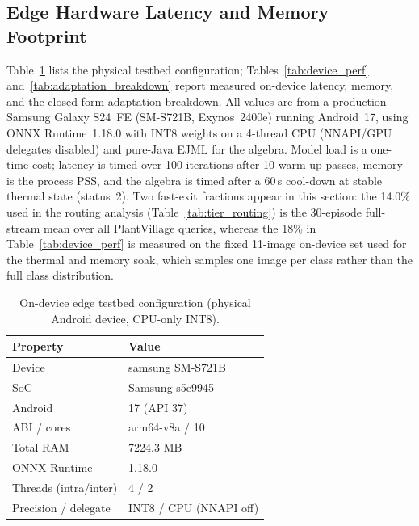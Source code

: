 \documentclass[preprint,12pt]{elsarticle}
\begin{document}
\subsection{Edge Hardware Latency and Memory Footprint}
\label{sec:edge_hardware}
Table~\ref{tab:device_spec} lists the physical testbed configuration; Tables~\ref{tab:device_perf} and~\ref{tab:adaptation_breakdown} report measured on-device latency, memory, and the closed-form adaptation breakdown. All values are from a production Samsung Galaxy S24~FE (SM-S721B, Exynos~2400e) running Android~17, using ONNX Runtime~1.18.0 with INT8 weights on a 4-thread CPU (NNAPI/GPU delegates disabled) and pure-Java EJML for the algebra. Model load is a one-time cost; latency is timed over 100 iterations after 10 warm-up passes, memory is the process PSS, and the algebra is timed after a 60\,s cool-down at stable thermal state (status~2). Two fast-exit fractions appear in this section: the 14.0\% used in the routing analysis (Table~\ref{tab:tier_routing}) is the 30-episode full-stream mean over all PlantVillage queries, whereas the 18\% in Table~\ref{tab:device_perf} is measured on the fixed 11-image on-device set used for the thermal and memory soak, which samples one image per class rather than the full class distribution.

\begin{table}[htbp]
\caption{On-device edge testbed configuration (physical Android device, CPU-only INT8).}
\label{tab:device_spec}
\centering

\footnotesize
\begin{tabular}{ll}
\toprule
Property & Value \\
\midrule
Device & samsung SM-S721B \\
SoC & Samsung s5e9945 \\
Android & 17 (API 37) \\
ABI / cores & arm64-v8a / 10 \\
Total RAM & 7224.3 MB \\
ONNX Runtime & 1.18.0 \\
Threads (intra/inter) & 4 / 2 \\
Precision / delegate & INT8 / CPU (NNAPI off) \\
\bottomrule
\end{tabular}
\end{table}
\end{document}
